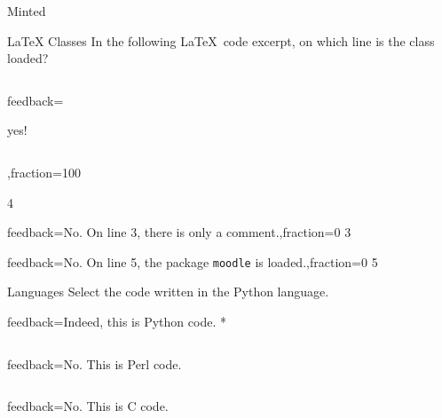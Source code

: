\documentclass{article}
\begin{document}
\begin{quiz}{Minted}

\begin{numerical}[tolerance=0]{LaTeX Classes}
In the following \LaTeX\ code excerpt, on which line is the class loaded?
\inputminted{latex}{_minted-test_minted/test.tex}
\item[feedback={yes! 
\inputminted[highlightlines={3}]{latex}{_minted-test_minted/test.tex}},fraction=100]
 4
\item[feedback={No. On line 3, there is only a comment.},fraction=0] 3
\item[feedback={No. On line 5, the package \texttt{moodle} is 
loaded.},fraction=0] 5
\end{numerical}

%
\begin{multi}{Languages}
Select the code written in the Python language.
\item[feedback={Indeed, this is Python code.}]* 
\inputminted[highlightlines={2,4-5},numbers=both]{python}{_minted-test_minted/test.py}
\item[feedback={No. This is Perl code.}]
\inputminted[highlightlines={2,4-5},numbers=right,style=colorful]{perl}{_minted-test_minted/test.pl}
\item[feedback={No. This is C code.}]
\inputminted[numbers=left]{c}{_minted-test_minted/test.c}
\end{multi}


\end{quiz}
\end{document}
